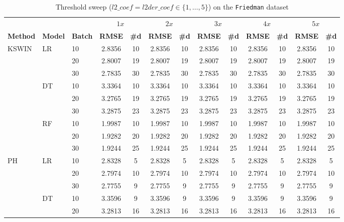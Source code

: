 \begin{table}[h]
    \centering
    \scriptsize
    \caption{Threshold sweep ($l2\_coef = l2der\_coef \in \{1,\ldots,5\}$) on the \texttt{Friedman} dataset}
    \label{tab:thr_sweep_Friedman}
    \begin{tabular}{ll lcccccccccc}\toprule
        & & & \multicolumn{2}{c}{$1x$} & \multicolumn{2}{c}{$2x$} & \multicolumn{2}{c}{$3x$} & \multicolumn{2}{c}{$4x$} & \multicolumn{2}{c}{$5x$} \\
        \cmidrule(lr){4-5}\cmidrule(lr){6-7}\cmidrule(lr){8-9}\cmidrule(lr){10-11}\cmidrule(lr){12-13}
        \textbf{Method} & \textbf{Model} & \textbf{Batch} & \textbf{RMSE} & \textbf{\#d} & \textbf{RMSE} & \textbf{\#d} & \textbf{RMSE} & \textbf{\#d} & \textbf{RMSE} & \textbf{\#d} & \textbf{RMSE} & \textbf{\#d} \\\midrule
    KSWIN & LR & 10 & 2.8356 & 10 & 2.8356 & 10 & 2.8356 & 10 & 2.8356 & 10 & 2.8356 & 10 \\
     &  & 20 & 2.8007 & 19 & 2.8007 & 19 & 2.8007 & 19 & 2.8007 & 19 & 2.8007 & 19 \\
     &  & 30 & 2.7835 & 30 & 2.7835 & 30 & 2.7835 & 30 & 2.7835 & 30 & 2.7835 & 30 \\
     & DT & 10 & 3.3364 & 10 & 3.3364 & 10 & 3.3364 & 10 & 3.3364 & 10 & 3.3364 & 10 \\
     &  & 20 & 3.2765 & 19 & 3.2765 & 19 & 3.2765 & 19 & 3.2765 & 19 & 3.2765 & 19 \\
     &  & 30 & 3.2875 & 23 & 3.2875 & 23 & 3.2875 & 23 & 3.2875 & 23 & 3.2875 & 23 \\
     & RF & 10 & 1.9987 & 10 & 1.9987 & 10 & 1.9987 & 10 & 1.9987 & 10 & 1.9987 & 10 \\
     &  & 20 & 1.9282 & 20 & 1.9282 & 20 & 1.9282 & 20 & 1.9282 & 20 & 1.9282 & 20 \\
     &  & 30 & 1.9244 & 25 & 1.9244 & 25 & 1.9244 & 25 & 1.9244 & 25 & 1.9244 & 25 \\
    \midrule
    PH & LR & 10 & 2.8328 & 5 & 2.8328 & 5 & 2.8328 & 5 & 2.8328 & 5 & 2.8328 & 5 \\
     &  & 20 & 2.7974 & 10 & 2.7974 & 10 & 2.7974 & 10 & 2.7974 & 10 & 2.7974 & 10 \\
     &  & 30 & 2.7755 & 9 & 2.7755 & 9 & 2.7755 & 9 & 2.7755 & 9 & 2.7755 & 9 \\
     & DT & 10 & 3.3596 & 9 & 3.3596 & 9 & 3.3596 & 9 & 3.3596 & 9 & 3.3596 & 9 \\
     &  & 20 & 3.2813 & 16 & 3.2813 & 16 & 3.2813 & 16 & 3.2813 & 16 & 3.2813 & 16 \\

\end{tabular}
\end{table}
